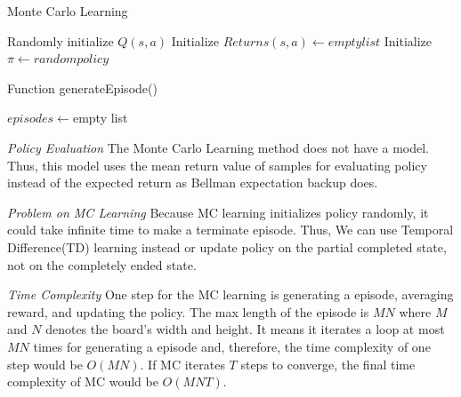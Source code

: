 \documentclass{article}
\begin{document}
\begin{algorithm}[H]
\caption{Monte Carlo Learning}\label{alg:mc}
Randomly initialize $Q(s,a)$ \;
Initialize $Returns(s,a) \gets empty list$\;
Initialize $\pi \gets random policy$\; 
\end{algorithm}

\begin{algorithm}[H]
\caption{Function generateEpisode()}\label{alg:genEpisode}
$episodes \gets $empty list\;
\end{algorithm}

\textit{Policy Evaluation}
The Monte Carlo Learning method does not have a model. Thus, this model uses the mean return value of samples for evaluating policy instead of the expected return as Bellman expectation backup does. 

\textit{Problem on MC Learning}
Because MC learning initializes policy randomly, it could take infinite time to make a terminate episode. Thus, We can use Temporal Difference(TD) learning instead or update policy on the partial completed state, not on the completely ended state.

\textit{Time Complexity}
One step for the MC learning is generating a episode, averaging reward, and updating the policy. The max length of the episode is $MN$ where $M$ and $N$ denotes the board’s width and height. It means it iterates a loop at most $MN$ times for generating a episode and, therefore, the time complexity of one step would be $O(MN)$. If MC iterates $T$ steps to converge, the final time complexity of MC would be $O(MNT)$. 
\end{document}
